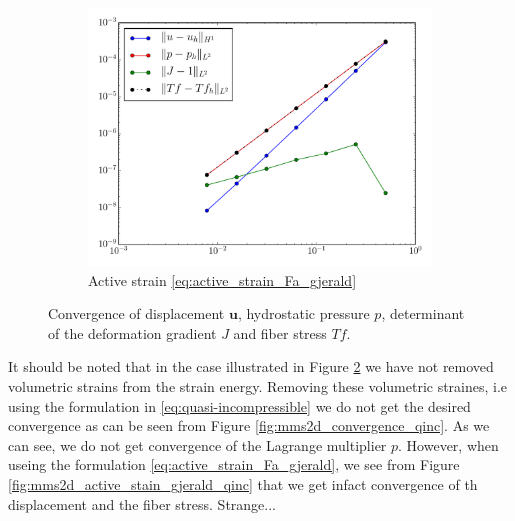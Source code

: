 \documentclass[a4paper,10pt]{article}
\newcommand{\uvec}{\mathbf{u}}
\begin{document}
\begin{figure}[htbp]
\begin{subfigure}[t]{0.3\textwidth}
\end{subfigure}
\begin{subfigure}[t]{0.3\textwidth}
    \includegraphics[width=\textwidth]{figures/mms2d_active_strain}
    \caption{\label{fig:mms2d_active_stain_gjerald}Active strain \eqref{eq:active_strain_Fa_gjerald} }    
\end{subfigure}
\label{fig:mms2d_convergence_inc}
\caption{Convergence of displacement $\uvec$, hydrostatic pressure $p$, determinant of the deformation gradient $J$ and fiber stress $Tf$.}  
\end{figure}

It should be noted that in the case illustrated in Figure \ref{fig:mms2d_convergence_inc} we have not removed volumetric strains
from the strain energy. Removing these volumetric straines, i.e using the formulation in \eqref{eq:quasi-incompressible}
we do not get the desired convergence as can be seen from Figure \ref{fig:mms2d_convergence_qinc}. As we can see, we do not get convergence of the Lagrange multiplier $p$. However, when useing the formulation \eqref{eq:active_strain_Fa_gjerald}, we see from Figure \ref{fig:mms2d_active_stain_gjerald_qinc} that we get infact convergence of th displacement and the fiber stress. Strange...
\end{document}
